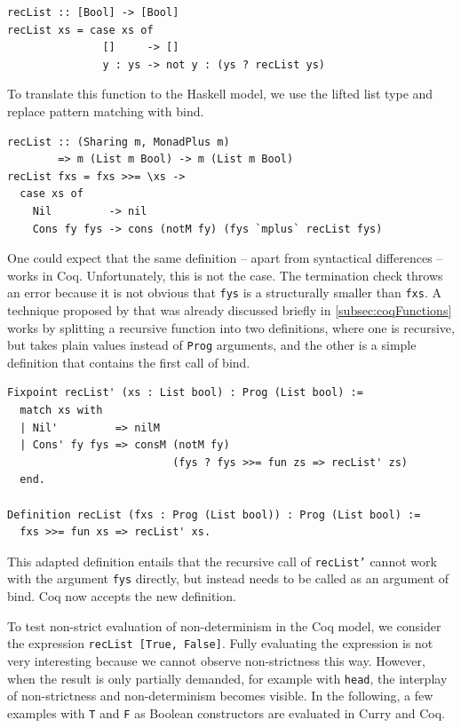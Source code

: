 \documentclass[a4paper, 11pt, fleqn, twoside, abstract=on]{scrreprt}
\newcommand{\hinl}[1]{\texttt{#1}}
\newcommand{\cinl}[1]{\texttt{#1}}
\begin{document}
\begin{verbatim}
recList :: [Bool] -> [Bool]
recList xs = case xs of
               []     -> []
               y : ys -> not y : (ys ? recList ys)
\end{verbatim}

To translate this function to the Haskell model, we use the lifted list type and replace pattern matching with bind.

\begin{verbatim}
recList :: (Sharing m, MonadPlus m) 
        => m (List m Bool) -> m (List m Bool)
recList fxs = fxs >>= \xs ->
  case xs of
    Nil         -> nil
    Cons fy fys -> cons (notM fy) (fys `mplus` recList fys)
\end{verbatim}

One could expect that the same definition -- apart from syntactical differences -- works in Coq.
Unfortunately, this is not the case.
The termination check throws an error because it is not obvious that \hinl{fys} is a structurally smaller than \hinl{fxs}.
A technique proposed by \citet{chlipala2013certified} that was already discussed briefly in \autoref{subsec:coqFunctions} works by splitting a recursive function into two definitions, where one is recursive, but takes plain values instead of \cinl{Prog} arguments, and the other is a simple definition that contains the first call of bind.

\begin{verbatim}
Fixpoint recList' (xs : List bool) : Prog (List bool) :=
  match xs with
  | Nil'         => nilM
  | Cons' fy fys => consM (notM fy)
                          (fys ? fys >>= fun zs => recList' zs)
  end.

Definition recList (fxs : Prog (List bool)) : Prog (List bool) :=
  fxs >>= fun xs => recList' xs.
\end{verbatim}

This adapted definition entails that the recursive call of \hinl{recList'} cannot work with the argument \cinl{fys} directly, but instead needs to be called as an argument of bind.
Coq  now accepts the new definition.

To test non-strict evaluation of non-determinism in the Coq model, we consider the expression \hinl{recList [True, False]}.
Fully evaluating the expression is not very interesting because we cannot observe non-strictness this way.
However, when the result is only partially demanded, for example with \cinl{head}, the interplay of non-strictness and non-determinism becomes visible.
In the following, a few examples with \hinl{T} and \hinl{F} as Boolean constructors are evaluated in Curry and Coq.
\end{document}
